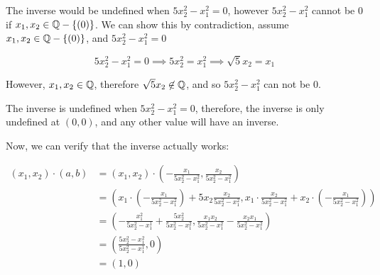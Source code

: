 \documentclass[12pt]{article} %
\begin{document}
\begin{homeworkProblem}
    The inverse would be undefined when $5x_2^2 - x_1^2 = 0$, however $5x_2^2 - x_1^2$ cannot be 0 if $x_1, x_2 \in \mathbb{Q} - \{(0)\}$. We can show this by contradiction, assume $x_1, x_2 \in \mathbb{Q}-\{(0)\}$, and $5x_2^2 - x_1^2 = 0$

    $$
        5x_2^2 - x_1^2 = 0 \implies 5x_2^2 = x_1^2 \implies \sqrt{5}x_2 = x_1
    $$

    However, $x_1, x_2 \in \mathbb{Q}$, therefore $\sqrt{5}x_2 \not \in \mathbb{Q}$, and so $5x_2^2 - x_1^2$ can not be 0.

    The inverse is undefined when $5x_2^2 - x_1^2 = 0$, therefore, the inverse is only undefined at $(0, 0)$, and any other value will have an inverse.

    Now, we can verify that the inverse actually works:

    \begin{align*}
        (x_1, x_2) \cdot (a, b)
         & = (x_1, x_2) \cdot (- \frac{x_1}{5x_2^2 - x_1^2}, \frac{x_2}{5x_2^2 - x_1^2})                                                                                     \\
         & = (x_1 \cdot (- \frac{x_1}{5x_2^2 - x_1^2}) + 5 x_2 \frac{x_2}{5x_2^2 - x_1^2},  x_1 \cdot \frac{x_2}{5x_2^2 - x_1^2} + x_2 \cdot (- \frac{x_1}{5x_2^2 - x_1^2})) \\
         & = (-\frac{x_1^2}{5 x_2^2 - x_1^1} + \frac{5x_2^2}{5x_2^2 - x_1^2}, \frac{x_1 x_2}{5x_2^2 - x_1^2} - \frac{x_2 x_1}{5x_2^2 - x_1^2})                               \\
         & = (\frac{5x_2^2 - x_1^2}{5 x_2^2 - x_1^1}, 0)                                                                                                                     \\
         & = (1, 0)
    \end{align*}

\end{homeworkProblem}
\pagebreak
\end{document}
